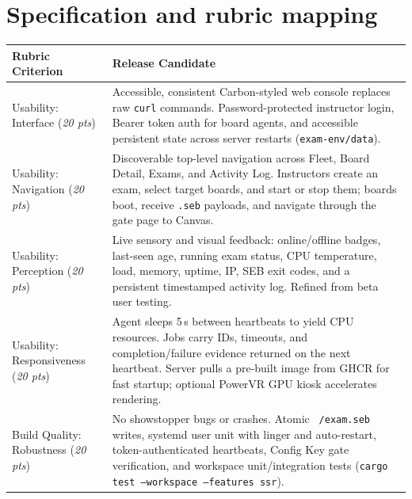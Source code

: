 \documentclass[11pt]{article}
\begin{document}
\section{Specification and rubric mapping}

\begin{table}[H]
  \centering
  \footnotesize
  \setlength{\tabcolsep}{5pt}
  \begin{tabularx}{\textwidth}{@{}p{} >{\raggedright\arraybackslash}X@{}}
    \toprule
    \textbf{Rubric Criterion} & \textbf{Release Candidate} \\
    \midrule
    Usability: Interface \newline (\textit{20 pts}) &
    Accessible, consistent Carbon-styled web console replaces raw \texttt{curl} commands. Password-protected instructor login, Bearer token auth for board agents, and accessible persistent state across server restarts (\texttt{exam-env/data}). \\
    Usability: Navigation \newline (\textit{20 pts}) &
    Discoverable top-level navigation across Fleet, Board Detail, Exams, and Activity Log. Instructors create an exam, select target boards, and start or stop them; boards boot, receive \texttt{.seb} payloads, and navigate through the gate page to Canvas. \\
    Usability: Perception \newline (\textit{20 pts}) &
    Live sensory and visual feedback: online/offline badges, last-seen age, running exam status, CPU temperature, load, memory, uptime, IP, SEB exit codes, and a persistent timestamped activity log. Refined from beta user testing. \\
    Usability: Responsiveness \newline (\textit{20 pts}) &
    Agent sleeps 5\,s between heartbeats to yield CPU resources. Jobs carry IDs, timeouts, and completion/failure evidence returned on the next heartbeat. Server pulls a pre-built image from GHCR for fast startup; optional PowerVR GPU kiosk accelerates rendering. \\
    Build Quality: Robustness \newline (\textit{20 pts}) &
    No showstopper bugs or crashes. Atomic \texttt{~/exam.seb} writes, systemd user unit with linger and auto-restart, token-authenticated heartbeats, Config Key gate verification, and workspace unit/integration tests (\texttt{cargo test --workspace --features ssr}). \\

\end{tabularx}
\end{table}
\end{document}
